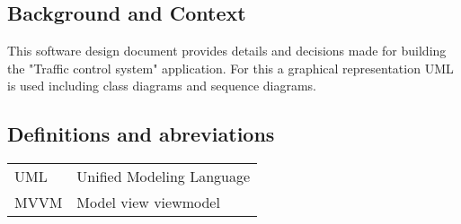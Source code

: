 \documentclass[twoside,a4paper,11pt]{article}
\title{\Title}
\author{}
\date{\today}
\begin{document}
\begin{titlepage}
\maketitle
\end{titlepage}

  	\linespread{1.15} %
    
  	\subsection*{Background and Context}
  	This software design document provides details and decisions made for building the "Traffic control system" application. For this a graphical representation UML is used including class diagrams and sequence diagrams.
  	
  	\subsection*{Definitions and abreviations}
  	\begin{longtable}[l]{p{80pt} p{350pt}} 
  		UML & Unified Modeling Language\\
  		MVVM & Model view viewmodel\\
  	\end{longtable}
  	
  	\tableofcontents
 
  	\newpage
  	
  	
  	
  	
    
    
\end{document}
